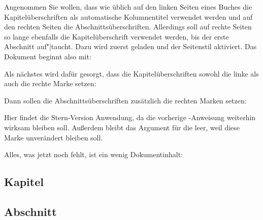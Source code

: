    \begin{Example}
      Angenommen Sie wollen, dass wie üblich auf den linken Seiten eines
      Buches die Kapitelüberschriften als automatische Kolumnentitel verwendet
      werden und auf den rechten Seiten die
      Abschnittsüberschriften. Allerdings soll auf rechte Seiten so lange
      ebenfalls die Kapitelüberschrift verwendet werden, bis der erste
      Abschnitt auf"|taucht. Dazu wird zuerst
       geladen und der Seitenstil 
      aktiviert. Das Dokument beginnt also mit:
      Als nächstes wird dafür gesorgt, dass die Kapitelüberschriften sowohl
      die linke als auch die rechte Marke setzen:
\begin{lstcode}
\end{lstcode}
      Dann sollen die Abschnittsüberschriften zusätzlich die rechten Marken
      setzen:
\begin{lstcode}
   \automark*[section]{}
\end{lstcode}
      Hier findet die Stern-Version Anwendung, da die vorherige
      -Anweisung weiterhin wirksam bleiben soll. Außerdem
      bleibt das Argument für die 
      leer, weil diese Marke unverändert bleiben soll.

      Alles, was jetzt noch fehlt, ist ein wenig Dokumentinhalt:
\begin{lstcode}
  \usepackage{lipsum}
  
  \chapter{Kapitel}
  \lipsum[1-20]
  \section{Abschnitt}
  \lipsum[21-40]
  
\end{lstcode}


\end{Example}
